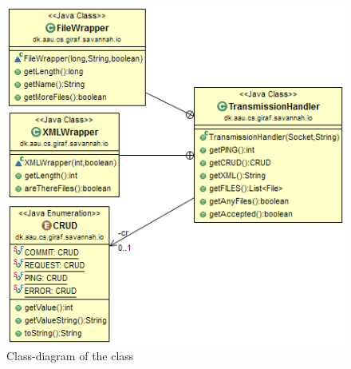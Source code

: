 \begin{figure}[H]
	\centering
		\includegraphics[scale=0.70]{images/TransmissionHandler.PNG}
	\caption{Class-diagram of the  class}
	\label{fig:app:TransmissionHandler}
\end{figure}